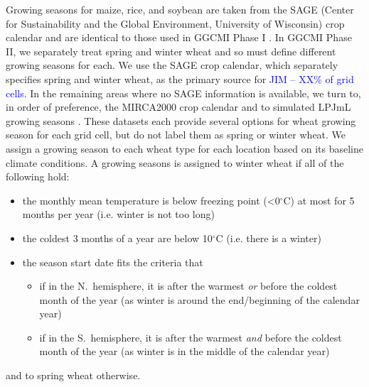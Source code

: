 \documentclass[gmd, manuscript]{copernicus} %
\begin{document}
Growing seasons for maize, rice, and soybean are taken from the SAGE (Center for Sustainability and the Global Environment, University of Wisconsin) crop calendar \citep{Sacks2010} and are identical to those used in GGCMI Phase I \citep{Elliott2015}.
In GGCMI Phase II, we separately treat spring and winter wheat and so must define different growing seasons for each.
We use the SAGE crop calendar, which separately specifies spring and winter wheat, as the primary source for \textcolor{blue}{JIM -- XX\% of grid cells}. 
In the remaining areas where no SAGE information is available, we turn to, in order of preference, the MIRCA2000 crop calendar \citep{Portmann2010} and to simulated LPJmL growing seasons \citep{waha2012climate}.  
These datasets each provide several options for wheat growing season for each grid cell, but do not label them as spring or winter wheat. We assign a growing season to each wheat type for each location based on its baseline climate conditions. 
A growing seasons is assigned to winter wheat if all of the following hold:
\begin{itemize} %
\item the monthly mean temperature is below freezing point (<0$^\circ$C) at most for 5 months per year (i.e. winter is not too long)
\item the coldest 3 months of a year are below 10$^\circ$C (i.e. there is a winter)
\item the season start date fits the criteria that
  \begin{itemize} 
    \item if in the N.\ hemisphere, it is after the warmest \textit{or} before the coldest month of the year (as winter is around the end/beginning of the calendar year)
    \item if in the S.\ hemisphere, it is after the warmest \textit{and} before the coldest month of the year (as winter is in the middle of the calendar year)
    \end{itemize}
\end{itemize}
and to spring wheat otherwise. 
\end{document}

